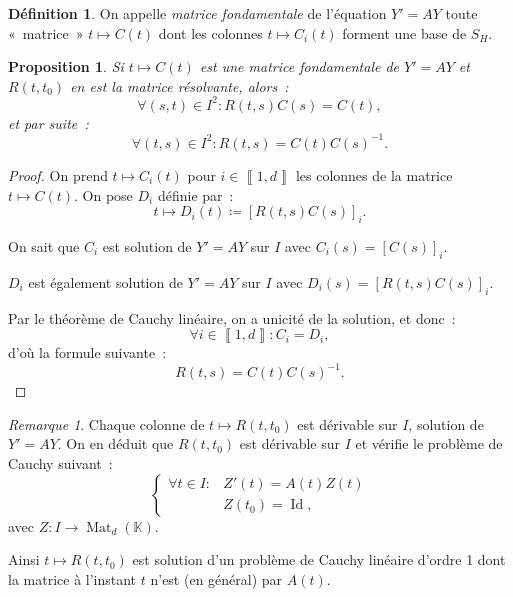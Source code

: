 \documentclass{report}
\newtheorem{prp}[thm]{Proposition}
\theoremstyle{definition}
\newtheorem{déf}[thm]{Définition}
\theoremstyle{remark}
\newtheorem*{rmq}{Remarque}
\numberwithin{equation}{section}
\newcommand{\K}{\mathbb K}
\DeclareMathOperator{\Mat}{Mat}
\DeclareMathOperator{\Id}{Id}
\newcommand{\intint}[2]{\left\llbracket#1, #2\right\rrbracket}
\begin{document}
		\begin{déf} On appelle \textit{matrice fondamentale} de l'équation $Y' = AY$ toute «~matrice~» $t \mapsto C(t)$ dont les colonnes $t \mapsto C_i(t)$
		forment une base de $S_H$.
		\end{déf}

		\begin{prp} Si $t \mapsto C(t)$ est une matrice fondamentale de $Y' = AY$ et $R(t, t_0)$ en est la matrice résolvante, alors~:
		\begin{equation}
			\forall (s, t) \in I^2 : R(t, s)C(s) = C(t),
		\end{equation}
		et par suite~:
		\begin{equation}
			\forall (t, s) \in I^2 : R(t, s) = C(t)C(s)^{-1}.
		\end{equation}
		\end{prp}

		\begin{proof} On prend $t \mapsto C_i(t)$ pour $i \in \intint 1d$ les colonnes de la matrice $t \mapsto C(t)$. On pose $D_i$ définie par~:
		\begin{equation}
			t \mapsto D_i(t) \coloneqq \left[R(t, s)C(s)\right]_i.
		\end{equation}

		On sait que $C_i$ est solution de $Y' = AY$ sur $I$ avec $C_i(s) = [C(s)]_i$.

		$D_i$ est également solution de $Y' = AY$ sur $I$ avec $D_i(s) = [R(t, s)C(s)]_i$.

		Par le théorème de Cauchy linéaire, on a unicité de la solution, et donc~:
		\begin{equation}
			\forall i \in \intint 1d : C_i = D_i,
		\end{equation}
		d'où la formule suivante~:
		\begin{equation}
			R(t, s) = C(t)C(s)^{-1}.
		\end{equation}
		\end{proof}

		\begin{rmq} Chaque colonne de $t \mapsto R(t, t_0)$ est dérivable sur $I$, solution de $Y'=AY$. On en déduit que $R(t, t_0)$ est dérivable sur $I$
		et vérifie le problème de Cauchy suivant~:
		\begin{equation}
			\begin{cases}
			\forall t \in I : &Z'(t) = A(t)Z(t) \\
			&Z(t_0) = \Id,
		\end{cases}
		\end{equation}
		avec $Z : I \to \Mat_d(\K)$.

		Ainsi $t \mapsto R(t, t_0)$ est solution d'un problème de Cauchy linéaire d'ordre 1 dont la matrice à l'instant $t$ n'est (en général) par $A(t)$.
		\end{rmq}
\end{document}
